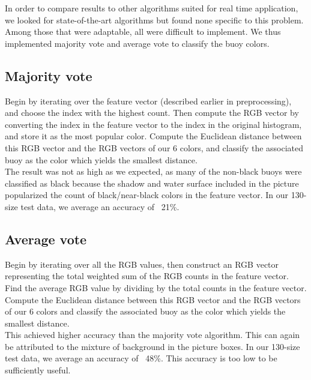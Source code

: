\documentclass{article} %
\begin{document}
In order to compare results to other algorithms suited for real time application, we looked for state-of-the-art algorithms but found none specific to this problem. Among those that were adaptable, all were difficult to implement. We thus implemented majority vote and average vote to classify the buoy colors.

\subsection{Majority vote}
Begin by iterating over the feature vector (described earlier in preprocessing), and choose the index with the highest count. Then compute the RGB vector by converting the index in the feature vector to the index in the original histogram, and store it as the most popular color. Compute the Euclidean distance between this RGB vector and the RGB vectors of our 6 colors, and classify the associated buoy as the color which yields the smallest distance.\\
The result was not as high as we expected, as many of the non-black buoys were classified as black because the shadow and water surface included in the picture popularized the count of black/near-black colors in the feature vector. In our 130-size test data, we average an accuracy of ~21\%.

\subsection{Average vote}
Begin by iterating over all the RGB values, then construct an RGB vector representing the total weighted sum of the RGB counts in the feature vector. Find the average RGB value by dividing by the total counts in the feature vector. Compute the Euclidean distance between this RGB vector and the RGB vectors of our 6 colors and classify the associated buoy as the color which yields the smallest distance.\\
This achieved higher accuracy than the majority vote algorithm. This can again be attributed to the mixture of background in the picture boxes. In our 130-size test data, we average an accuracy of ~48\%. This accuracy is too low to be sufficiently useful.
\end{document}
